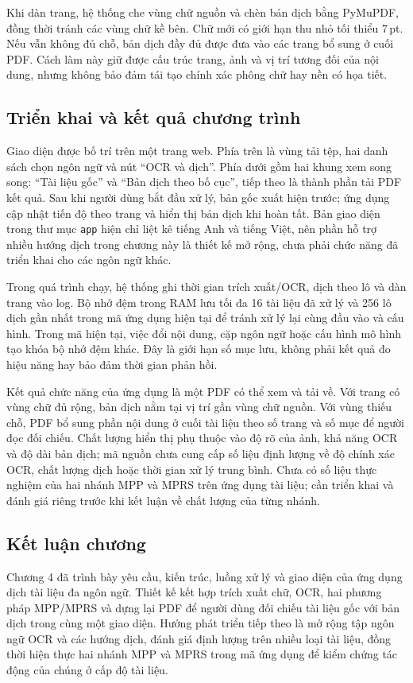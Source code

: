 Khi dàn trang, hệ thống che vùng chữ nguồn và chèn bản dịch bằng PyMuPDF, đồng thời tránh các vùng chữ kề bên. Chữ mới có giới hạn thu nhỏ tối thiểu 7\,pt. Nếu vẫn không đủ chỗ, bản dịch đầy đủ được đưa vào các trang bổ sung ở cuối PDF. Cách làm này giữ được cấu trúc trang, ảnh và vị trí tương đối của nội dung, nhưng không bảo đảm tái tạo chính xác phông chữ hay nền có họa tiết.

\subsection{Triển khai và kết quả chương trình}

Giao diện được bố trí trên một trang web. Phía trên là vùng tải tệp, hai danh sách chọn ngôn ngữ và nút ``OCR và dịch''. Phía dưới gồm hai khung xem song song: ``Tài liệu gốc'' và ``Bản dịch theo bố cục'', tiếp theo là thành phần tải PDF kết quả. Sau khi người dùng bắt đầu xử lý, bản gốc xuất hiện trước; ứng dụng cập nhật tiến độ theo trang và hiển thị bản dịch khi hoàn tất. Bản giao diện trong thư mục \texttt{app} hiện chỉ liệt kê tiếng Anh và tiếng Việt, nên phần hỗ trợ nhiều hướng dịch trong chương này là thiết kế mở rộng, chưa phải chức năng đã triển khai cho các ngôn ngữ khác.

Trong quá trình chạy, hệ thống ghi thời gian trích xuất/OCR, dịch theo lô và dàn trang vào log. Bộ nhớ đệm trong RAM lưu tối đa 16 tài liệu đã xử lý và 256 lô dịch gần nhất trong mã ứng dụng hiện tại để tránh xử lý lại cùng đầu vào và cấu hình. Trong mã hiện tại, việc đổi nội dung, cặp ngôn ngữ hoặc cấu hình mô hình tạo khóa bộ nhớ đệm khác. Đây là giới hạn số mục lưu, không phải kết quả đo hiệu năng hay bảo đảm thời gian phản hồi.

Kết quả chức năng của ứng dụng là một PDF có thể xem và tải về. Với trang có vùng chữ đủ rộng, bản dịch nằm tại vị trí gần vùng chữ nguồn. Với vùng thiếu chỗ, PDF bổ sung phần nội dung ở cuối tài liệu theo số trang và số mục để người đọc đối chiếu. Chất lượng hiển thị phụ thuộc vào độ rõ của ảnh, khả năng OCR và độ dài bản dịch; mã nguồn chưa cung cấp số liệu định lượng về độ chính xác OCR, chất lượng dịch hoặc thời gian xử lý trung bình. Chưa có số liệu thực nghiệm của hai nhánh MPP và MPRS trên ứng dụng tài liệu; cần triển khai và đánh giá riêng trước khi kết luận về chất lượng của từng nhánh.

\subsection{Kết luận chương}

Chương 4 đã trình bày yêu cầu, kiến trúc, luồng xử lý và giao diện của ứng dụng dịch tài liệu đa ngôn ngữ. Thiết kế kết hợp trích xuất chữ, OCR, hai phương pháp MPP/MPRS và dựng lại PDF để người dùng đối chiếu tài liệu gốc với bản dịch trong cùng một giao diện. Hướng phát triển tiếp theo là mở rộng tập ngôn ngữ OCR và các hướng dịch, đánh giá định lượng trên nhiều loại tài liệu, đồng thời hiện thực hai nhánh MPP và MPRS trong mã ứng dụng để kiểm chứng tác động của chúng ở cấp độ tài liệu.
